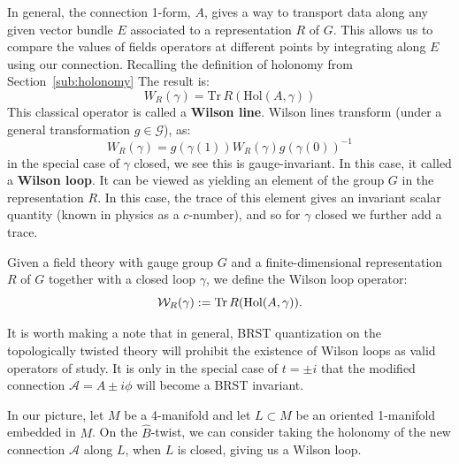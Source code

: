 	In general, the connection 1-form, $A$, gives a way to transport data along any given vector bundle $E$ associated to a representation $R$ of $G$. This allows us to compare the values of fields operators at different points by integrating along $E$ using our connection. Recalling the definition of holonomy from Section~\ref{sub:holonomy} The result is: 
	\begin{equation}
		W_R (\gamma) = \mathrm{Tr}\, R( \mathrm{Hol}(A, \gamma))
	\end{equation}
	This classical operator is called a \textbf{Wilson line}.
	Wilson lines transform (under a general transformation $g \in \mathcal G$), as:
	\begin{equation}
		W_R(\gamma) = g(\gamma(1)) W_R(\gamma)  g(\gamma(0))^{-1}
	\end{equation}
	in the special case of $\gamma$ closed, we see this is gauge-invariant. In this case, it called a \textbf{Wilson loop}. It can be viewed as yielding an element of the group $G$ in the representation $R$. In this case, the trace of this element gives an invariant scalar quantity (known in physics as a $c$-number), and so for $\gamma$ closed we further add a trace.
	\begin{defn}
		Given a field theory with gauge group $G$ and a finite-dimensional representation $R$ of $G$ together with a closed loop $\gamma$, we define the Wilson loop operator:
		\begin{equation}
			\mathcal W_{R}(\gamma) := \mathrm{Tr}\, R( \mathrm{Hol}(A, \gamma)).
		\end{equation}
	\end{defn}
\noindent

	It is worth making a note that in general, BRST quantization on the topologically twisted theory will prohibit the existence of Wilson loops as valid operators of study. It is only in the special case of $t = \pm i$ that the modified connection $\mathcal A = A \pm i \phi$ will become a BRST invariant. 
	
	In our picture, let $M$ be a 4-manifold and let $L \subset M$ be an oriented 1-manifold embedded in $M$. On the $\hat B$-twist, we can consider taking the holonomy of the new connection $\mathcal A$ along $L$, when $L$ is closed, giving us a Wilson loop. 
	
	
